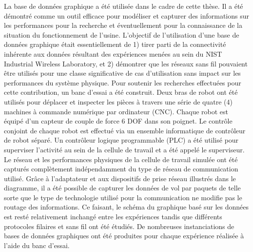 \documentclass[12pt]{article}
\begin{document}
La base de données graphique a été utilisée dans le cadre de cette thèse. Il a été démontré comme un outil efficace pour modéliser et capturer des informations sur les performances pour la recherche et éventuellement pour la connaissance de la situation du fonctionnement de l'usine. L'objectif de l'utilisation d'une base de données graphique était essentiellement de 1) tirer parti de la connectivité inhérente aux données résultant des expériences menées au sein du NIST Industrial Wireless Laboratory, et 2) démontrer que les réseaux sans fil pouvaient être utilisés pour une classe significative de cas d'utilisation sans impact sur les performances du système physique. Pour soutenir les recherches effectuées pour cette contribution, un banc d'essai a été construit. Deux bras de robot ont été utilisés pour déplacer et inspecter les pièces à travers une série de quatre (4) machines à commande numérique par ordinateur (CNC). Chaque robot est équipé d'un capteur de couple de force 6 DOF dans son poignet. Le contrôle conjoint de chaque robot est effectué via un ensemble informatique de contrôleur de robot séparé. Un contrôleur logique programmable (PLC) a été utilisé pour superviser l'activité au sein de la cellule de travail et a été appelé le superviseur. Le réseau et les performances physiques de la cellule de travail simulée ont été capturés complètement indépendamment du type de réseau de communication utilisé. Grâce à l'adaptateur et aux dispositifs de prise réseau illustrés dans le diagramme, il a été possible de capturer les données de vol par paquets de telle sorte que le type de technologie utilisé pour la communication ne modifie pas le routage des informations. Ce faisant, le schéma du graphique basé sur les données est resté relativement inchangé entre les expériences tandis que différents protocoles filaires et sans fil ont été étudiés. De nombreuses instanciations de bases de données graphiques ont été produites pour chaque expérience réalisée à l'aide du banc d'essai.  
\end{document}

